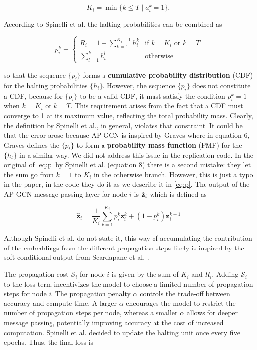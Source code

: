 \documentclass{gdl}
\begin{document}
\begin{equation}
K_i = \min\{ k \le T \mid a_i^k = 1 \},
\end{equation}

\noindent According to Spinelli et al. the halting probabilities can be combined as

\begin{equation}
    p_i^k = 
    \begin{cases}
    R_i = 1 - \sum_{k=1}^{K_i - 1} h_i^k & \text{if } k = K_i \text{ or } k = T \\
    \sum_{l=1}^{k} h_i^l & \text{otherwise}
    \end{cases}
    \label{eq:p}
\end{equation}

\noindent so that the sequence $\{p_i\}$ forms a \textbf{cumulative probability distribution} (CDF) for the halting probabilities $\{h_i\}$. However, the sequence $\{p_i\}$ does not constitute a CDF, because for $\{p_i\}$ to be a valid CDF, it must satisfy the condition $p_i^k = 1$ when $k = K_i$ or $k = T$. This requirement arises from the fact that a CDF must converge to 1 at its maximum value, reflecting the total probability mass. Clearly, the definition by Spinelli et al., in general, violates that constraint. It could be that the error arose because AP-GCN is inspired by Graves \cite{graves2017} where in equation 6, Graves defines the $\{p_t\}$ to form a \textbf{probability mass function} (PMF) for the $\{h_t\}$ in a similar way. We did not address this issue in the replication code. In the original of \autoref{eq:p} by Spinelli et al. (equation 8) there is a second mistake: they let the sum go from $k=1$ to $K_i$ in the otherwise branch. However, this is just a typo in the paper, in the code they do it as we describe it in \autoref{eq:p}.
The output of the AP-GCN message passing layer for node $i$ is $\hat{\bf{z}}_i$ which is defined as

\begin{equation}
\hat{\mathbf{z}}_i = \frac{1}{K_i} \sum_{k=1}^{K_i} p_i^k \mathbf{z}^k_i + (1-p^k_i) \mathbf{z}_i^{k-1} 
\label{eq:aggregate}
\end{equation}

\noindent Although Spinelli et al. do not state it, this way of accumulating the contribution of the embeddings from the different propagation steps likely is inspired by the soft-conditional output from Scardapane et al. \cite{scardapane2020}.

 The propagation cost $\mathcal{S}_i$ for node $i$ is given by the sum of $K_i$ and $R_i$. Adding $\mathcal{S}_i$ to the loss term incentivizes the model to choose a limited number of propagation steps for node $i$. The propagation penalty $\alpha$ controls the trade-off between accuracy and compute time. A larger $\alpha$ encourages the model to restrict the number of propagation steps per node, whereas a smaller $\alpha$ allows for deeper message passing, potentially improving accuracy at the cost of increased computation. Spinelli et al. decided to update the halting unit once every five epochs. Thus, the final loss is
\end{document}
